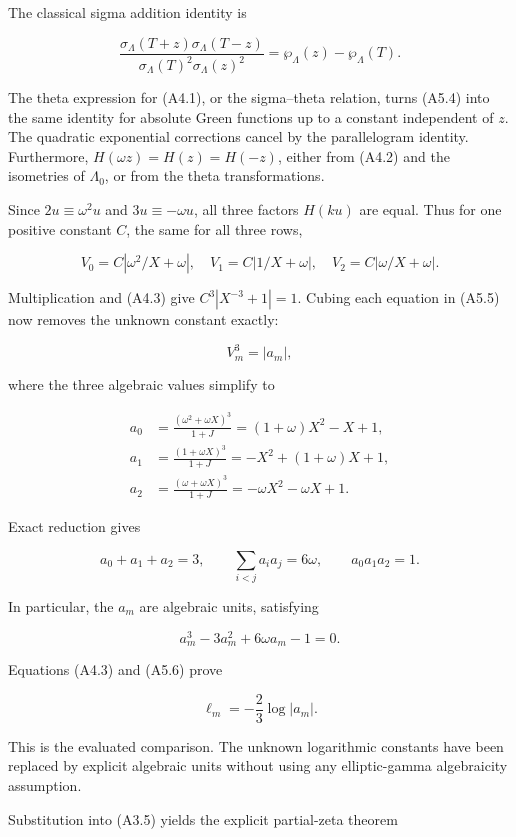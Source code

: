 The classical sigma addition identity is

\[
\frac{\sigma_\Lambda(T+z)\sigma_\Lambda(T-z)}{
\sigma_\Lambda(T)^2\sigma_\Lambda(z)^2}
=\wp_\Lambda(z)-\wp_\Lambda(T). \tag{A5.4}
\]

The theta expression for (A4.1), or the sigma--theta relation, turns
(A5.4) into the same identity for absolute Green functions up to a
constant independent of \(z\). The quadratic exponential corrections
cancel by the parallelogram identity. Furthermore,
\(H(\omega z)=H(z)=H(-z)\), either from (A4.2) and the isometries of
\(\Lambda_0\), or from the theta transformations.

Since \(2u\equiv\omega^2u\) and \(3u\equiv-\omega u\), all three factors
\(H(ku)\) are equal. Thus for one positive constant \(C\), the same for
all three rows,

\[
V_0=C|\omega^2/X+\omega|,\quad
V_1=C|1/X+\omega|,\quad
V_2=C|\omega/X+\omega|. \tag{A5.5}
\]

Multiplication and (A4.3) give \(C^3|X^{-3}+1|=1\). Cubing each equation
in (A5.5) now removes the unknown constant exactly:

\[
\boxed{V_m^3=|a_m|,} \tag{A5.6}
\]

where the three algebraic values simplify to

\[
\begin{aligned}
a_0&=\frac{(\omega^2+\omega X)^3}{1+J}
=(1+\omega)X^2-X+1,\\
a_1&=\frac{(1+\omega X)^3}{1+J}
=-X^2+(1+\omega)X+1,\\
a_2&=\frac{(\omega+\omega X)^3}{1+J}
=-\omega X^2-\omega X+1.
\end{aligned} \tag{A5.7}
\]

Exact reduction gives

\[
a_0+a_1+a_2=3,\qquad
\sum_{i<j}a_i a_j=6\omega,\qquad a_0a_1a_2=1.
\]

In particular, the \(a_m\) are algebraic units, satisfying

\[
a_m^3-3a_m^2+6\omega a_m-1=0. \tag{A5.8}
\]

Equations (A4.3) and (A5.6) prove

\[
\boxed{\ell_m=-\frac23\log|a_m|.} \tag{A5.9}
\]

This is the evaluated comparison. The unknown logarithmic constants have
been replaced by explicit algebraic units without using any
elliptic-gamma algebraicity assumption.

Substitution into (A3.5) yields the explicit partial-zeta theorem

